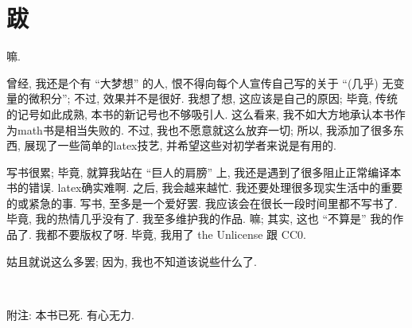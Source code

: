 \chapter{跋}

嘛.

曾经, 我还是个有 ``大梦想'' 的人,
恨不得向每个人宣传自己写的关于 ``(几乎) 无变量的微积分'';
不过, 效果并不是很好.
我想了想, 这应该是自己的原因;
毕竟, 传统的记号如此成熟, 本书的新记号也不够吸引人.
这么看来, 我不如大方地承认本书作为\gls{math}书是相当失败的.
不过, 我也不愿意就这么放弃一切;
所以, 我添加了很多东西, 展现了一些简单的\gls{latex}技艺,
并希望这些对初学者来说是有用的.

写书很累;
毕竟, 就算我站在 ``巨人的肩膀'' 上,
我还是遇到了很多阻止正常编译本书的错误.
\gls{latex}确实难啊.
之后, 我会越来越忙.
我还要处理很多现实生活中的重要的或紧急的事.
写书, 至多是一个爱好罢.
我应该会在很长一段时间里都不写书了.
毕竟, 我的热情几乎没有了.
我至多维护我的作品.
嘛; 其实, 这也 ``不算是'' 我的作品了.
我都不要版权了呀.
毕竟, 我用了 the Unlicense 跟 CC0.

姑且就说这么多罢;
因为, 我也不知道该说些什么了.

\begin{flushright}
    \theauthor\\
    \thedate
\end{flushright}

\vspace{2ex}

附注:
本书已死.
有心无力.
